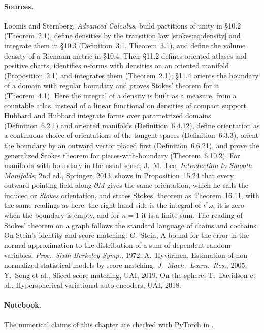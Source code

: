 \begin{notechapter}
\paragraph{Sources.} Loomis and Sternberg, \emph{Advanced Calculus},
build partitions of unity in \S10.2 (Theorem~2.1), define densities by
the transition law \eqref{stokes:eq:density} and integrate them in
\S10.3 (Definition~3.1, Theorem~3.1), and define the volume density of
a Riemann metric in \S10.4. Their \S11.2 defines oriented atlases and
positive charts, identifies $n$-forms with densities on an oriented
manifold (Proposition~2.1) and integrates them (Theorem~2.1); \S11.4
orients the boundary of a domain with regular boundary and proves
Stokes' theorem for it (Theorem~4.1). Here the integral of a density
is built as a measure, from a countable atlas, instead of a linear
functional on densities of compact support. Hubbard and Hubbard
integrate forms over parametrized domains (Definition~6.2.1) and
oriented manifolds (Definition~6.4.12), define orientation as a
continuous choice of orientations of the tangent spaces
(Definition~6.3.3), orient the boundary by an outward vector placed
first (Definition~6.6.21), and prove the generalized Stokes theorem for
pieces-with-boundary (Theorem~6.10.2). For manifolds with boundary in
the usual sense, J.~M.~Lee, \emph{Introduction to Smooth Manifolds},
2nd ed., Springer, 2013, shows in Proposition~15.24 that every
outward-pointing field along $\partial M$ gives the same orientation,
which he calls the induced or \emph{Stokes} orientation, and states
Stokes' theorem as Theorem~16.11, with the same readings as here: the
right-hand side is the integral of $\iota^*\omega$, it is zero when the
boundary is empty, and for $n = 1$ it is a finite sum. The reading of
Stokes' theorem on a graph follows the standard language of chains and
cochains. On
Stein's identity and score matching: C.~Stein, A bound for the error in
the normal approximation to the distribution of a sum of dependent
random variables, \emph{Proc.\ Sixth Berkeley Symp.}, 1972;
A.~Hyv\"arinen, Estimation of non-normalized statistical models by
score matching, \emph{J.\ Mach.\ Learn.\ Res.}, 2005; Y.~Song et al.,
Sliced score matching, UAI, 2019. On the sphere:
T.~Davidson et al., Hyperspherical variational auto-encoders, UAI,
2018.

\paragraph{Notebook.} The numerical claims of this chapter are checked
with PyTorch in .


\end{notechapter}
